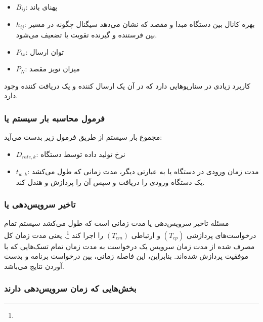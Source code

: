 \begin{itemize}
    \item $B_{ij}$: پهنای باند
    \item $h_{ij}$: بهره کانال بین دستگاه مبدا و مقصد که نشان می‌دهد سیگنال
    چگونه در مسیر بین فرستنده و گیرنده تقویت یا تضعیف می‌شود.
    \item $P_{tx}$: توان ارسال
    \item $P_{N}$: میزان نویز مقصد
\end{itemize}

کاربرد زیادی در سناریو‌هایی دارد که در آن یک ارسال کننده و یک دریافت کننده وجود
دارد.

\subsubsection{فرمول محاسبه بار سیستم یا }

مجموع بار سیستم از طریق فرمول زیر بدست می‌آید:


\begin{itemize}
    \item $D_{rate, k}$: نرخ تولید داده توسط دستگاه 
    \item $t_{w, k}$: مدت زمان ورودی در دستگاه  یا به عبارتی دیگر، مدت
    زمانی که طول می‌کشد یک دستگاه  ورودی را دریافت و سپس آن را پردازش و
    هندل کند.
\end{itemize}

\subsubsection{تاخیر سرویس‌دهی یا }

مسئله تاخیر سرویس‌دهی یا  مدت زمانی است
که طول می‌کشد سیستم  تمام درخواست‌های پردازشی $(T_{cp})$ و ارتباطی
$(T_{cm})$ را اجرا کند \footnote{}. یعنی مدت
زمان کل مصرف شده از مدت زمان سرویس یک درخواست به مدت زمان تمام تسک‌هایی که با
موفقیت پردازش شده‌اند.  بنابراین، این فاصله زمانی، بین درخواست برنامه و بدست
آوردن نتایج می‌باشد.

\subsubsection*{بخش‌هایی که زمان سرویس‌دهی دارند}


